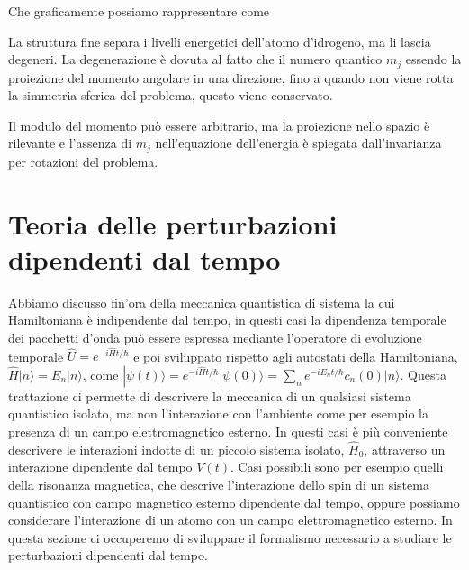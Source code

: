 Che graficamente possiamo rappresentare come 
\newpage

\vspace{1cm}
\begin{center}
\end{center} 
La struttura fine separa i livelli energetici dell'atomo d'idrogeno, ma li lascia degeneri. La degenerazione \`e dovuta al fatto che il numero quantico $m_j$ essendo la proiezione del momento angolare in una direzione, fino a quando non viene rotta la simmetria sferica del problema, questo viene conservato. 

Il modulo del momento pu\`o essere arbitrario, ma la proiezione nello spazio \`e rilevante e l'assenza di $m_j$ nell'equazione dell'energia \`e spiegata dall'invarianza per rotazioni del problema.

\section{Teoria delle perturbazioni dipendenti dal tempo }

Abbiamo discusso fin'ora della meccanica quantistica di sistema la cui Hamiltoniana \`e indipendente dal tempo, in questi casi la dipendenza temporale dei pacchetti d'onda pu\`o essere espressa mediante l'operatore di evoluzione temporale $\hat{U} = e^{-i \hat{H}t/\hbar}$ e poi sviluppato rispetto agli autostati della Hamiltoniana, $\hat{H}|n \rangle = E_n |n \rangle $, come $|\psi(t) \rangle = e^{-i \hat{H}t/\hbar}|\psi(0) \rangle  = \sum_{n} e^{-iE_nt/\hbar}c_n(0)|n \rangle$. Questa trattazione ci permette di descrivere la meccanica di un qualsiasi sistema quantistico isolato, ma non l'interazione con l'ambiente come per esempio la presenza di un campo elettromagnetico esterno. In questi casi \`e pi\`u conveniente descrivere le interazioni indotte di un piccolo sistema isolato, $\hat{H}_0$, attraverso un interazione dipendente dal tempo $V(t)$. Casi possibili sono per esempio quelli della risonanza magnetica, che descrive  l'interazione dello spin di un sistema quantistico con campo magnetico esterno dipendente dal tempo, oppure possiamo considerare l'interazione di un atomo con un campo elettromagnetico esterno. In questa sezione ci occuperemo di sviluppare il formalismo necessario a studiare le perturbazioni dipendenti dal tempo.

